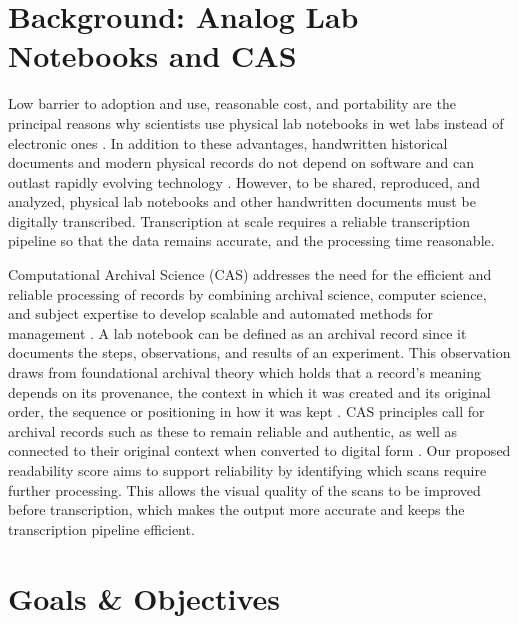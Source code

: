\documentclass[conference]{IEEEtran}
\begin{document}
\section{Background: Analog Lab Notebooks and CAS}

Low barrier to adoption and use, reasonable cost, and portability are the
principal reasons why scientists use physical lab notebooks in wet labs instead
of electronic ones \cite{kanza2017}. In addition to these advantages,
handwritten historical documents and modern physical records do not depend on
software and can outlast rapidly evolving technology \cite{ryan2007}. However,
to be shared, reproduced, and analyzed, physical lab notebooks and other
handwritten documents must be digitally transcribed. Transcription at scale
requires a reliable transcription pipeline so that the data remains accurate,
and the processing time reasonable.

Computational Archival Science (CAS) addresses the need for the efficient and
reliable processing of records by combining archival science, computer science,
and subject expertise to develop scalable and automated methods for management
\cite{marciano2018}. A lab notebook can be defined as an archival record since
it documents the steps, observations, and results of an experiment. This
observation draws from foundational archival theory which holds that a record's
meaning depends on its provenance, the context in which it was created and its
original order, the sequence or positioning in how it was kept
\cite{jenkinson1922}. CAS principles call for archival records such as these to
remain reliable and authentic, as well as connected to their original context
when converted to digital form \cite{hedges2022}. Our proposed readability
score aims to support reliability by identifying which scans require further
processing. This allows the visual quality of the scans to be improved before
transcription, which makes the output more accurate and keeps the transcription
pipeline efficient.

\section{Goals \& Objectives}
\end{document}
